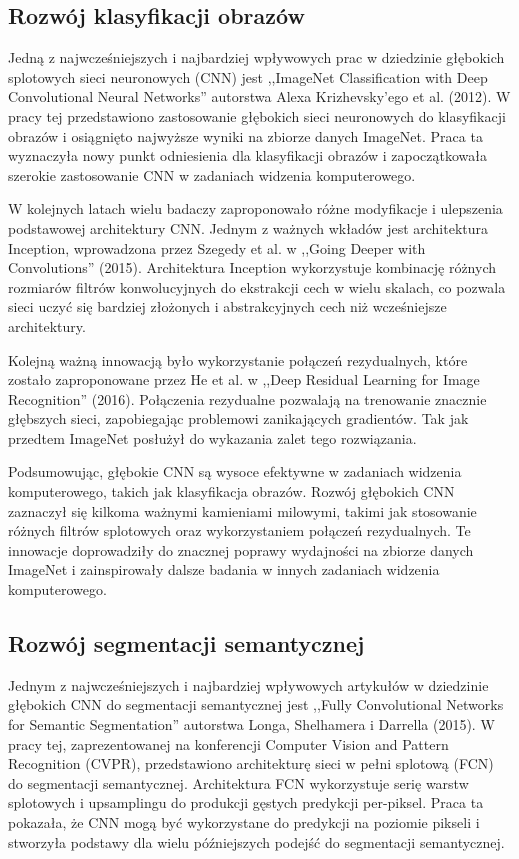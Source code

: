 \subsection{Rozwój klasyfikacji obrazów}
Jedną z najwcześniejszych i najbardziej wpływowych prac w dziedzinie głębokich splotowych sieci neuronowych (CNN) jest ,,ImageNet Classification with Deep Convolutional Neural Networks'' autorstwa Alexa Krizhevsky'ego et al. (2012)\cite{krizhevsky2017imagenet}. W pracy tej przedstawiono zastosowanie głębokich sieci neuronowych do klasyfikacji obrazów i osiągnięto najwyższe wyniki na zbiorze danych ImageNet. Praca ta wyznaczyła nowy punkt odniesienia dla klasyfikacji obrazów i zapoczątkowała szerokie zastosowanie CNN w zadaniach widzenia komputerowego.

W kolejnych latach wielu badaczy zaproponowało różne modyfikacje i ulepszenia podstawowej architektury CNN. Jednym z ważnych wkładów jest architektura Inception, wprowadzona przez Szegedy et al. w ,,Going Deeper with Convolutions'' (2015)\cite{szegedy2015going}. Architektura Inception wykorzystuje kombinację różnych rozmiarów filtrów konwolucyjnych do ekstrakcji cech w wielu skalach, co pozwala sieci uczyć się bardziej złożonych i abstrakcyjnych cech niż wcześniejsze architektury.

Kolejną ważną innowacją było wykorzystanie połączeń rezydualnych, które zostało zaproponowane przez He et al. w ,,Deep Residual Learning for Image Recognition'' (2016)\cite{he2016deep}. Połączenia rezydualne pozwalają na trenowanie znacznie głębszych sieci, zapobiegając problemowi zanikających gradientów. Tak jak przedtem ImageNet posłużył do wykazania zalet tego rozwiązania.

Podsumowując, głębokie CNN są wysoce efektywne w zadaniach widzenia komputerowego, takich jak klasyfikacja obrazów. Rozwój głębokich CNN zaznaczył się kilkoma ważnymi kamieniami milowymi, takimi jak stosowanie różnych filtrów splotowych oraz wykorzystaniem połączeń rezydualnych. Te innowacje doprowadziły do znacznej poprawy wydajności na zbiorze danych ImageNet i zainspirowały dalsze badania w innych zadaniach widzenia komputerowego.
\subsection{Rozwój segmentacji semantycznej}
Jednym z najwcześniejszych i najbardziej wpływowych artykułów w dziedzinie głębokich CNN do segmentacji semantycznej jest ,,Fully Convolutional Networks for Semantic Segmentation'' autorstwa Longa, Shelhamera i Darrella (2015)\cite{fcn}. W pracy tej, zaprezentowanej na konferencji Computer Vision and Pattern Recognition (CVPR), przedstawiono architekturę sieci w pełni splotową (FCN) do segmentacji semantycznej. Architektura FCN wykorzystuje serię warstw splotowych i upsamplingu do produkcji gęstych predykcji per-piksel. Praca ta pokazała, że CNN mogą być wykorzystane do predykcji na poziomie pikseli i stworzyła podstawy dla wielu późniejszych podejść do segmentacji semantycznej.

